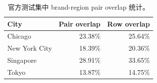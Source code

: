 \begin{table}[t]
\centering
\caption{官方测试集中 brand-region pair overlap 统计。}
\label{tab:pair_overlap}
\begin{tabular}{lrr}
\toprule
City & Pair overlap & Row overlap \\
\midrule
Chicago & 23.38\% & 25.64\% \\
New York City & 18.39\% & 20.36\% \\
Singapore & 28.91\% & 33.65\% \\
Tokyo & 13.87\% & 14.75\% \\
\bottomrule
\end{tabular}
\end{table}